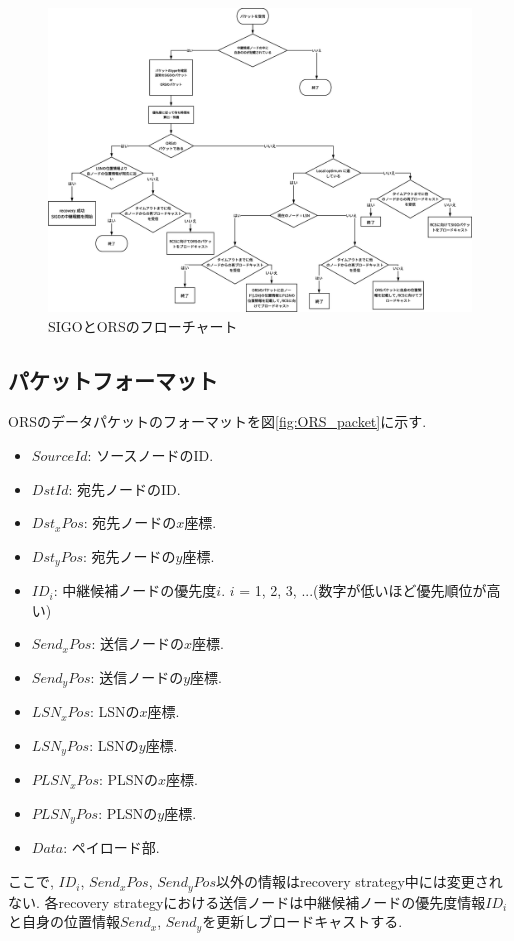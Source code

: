 \documentclass[10pt]{jreport}
\begin{document}
\begin{figure}[!ht]
	\centering
	\includegraphics[width=170mm]{figures/ORS.eps}
	\caption{SIGOとORSのフローチャート}
	\label{fig:ORS}
\end{figure}

\subsection{パケットフォーマット}
ORSのデータパケットのフォーマットを図\ref{fig:ORS_packet}に示す.

\begin{itemize}
	\item $SourceId$: ソースノードのID.
	\item $DstId$: 宛先ノードのID.
	\item $Dst_x Pos$: 宛先ノードの$x$座標.
	\item $Dst_y Pos$: 宛先ノードの$y$座標.
	\item $ID_i$: 中継候補ノードの優先度$i$. $i$ = 1, 2, 3, ...(数字が低いほど優先順位が高い) 
	\item $Send_x Pos$: 送信ノードの$x$座標.
	\item $Send_y Pos$: 送信ノードの$y$座標.
	\item $LSN_x Pos$: LSNの$x$座標.
	\item $LSN_y Pos$: LSNの$y$座標.
	\item $PLSN_x Pos$: PLSNの$x$座標.
	\item $PLSN_y Pos$: PLSNの$y$座標.
	\item $Data$: ペイロード部.
\end{itemize}

ここで, $ID_i$, $Send_x Pos$, $Send_y Pos$以外の情報はrecovery strategy中には変更されない. 各recovery strategyにおける送信ノードは中継候補ノードの優先度情報$ID_i$と自身の位置情報$Send_x$, $Send_y$を更新しブロードキャストする.
\end{document}
